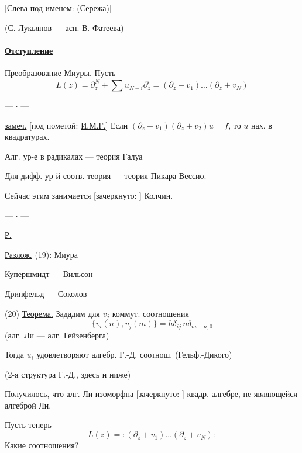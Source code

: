 [Слева под именем: (Сережа)]

(С. Лукьянов — асп. В. Фатеева)

\paragraph*{\underline{Отступление}}
\underline{Преобразование Миуры.} Пусть
\begin{equation*}
L(z)=\partial_z^N+\sum u_{N-i}\partial_z^i
=(\partial_z+v_1)\ldots(\partial_z+v_N) \tag{19}
\end{equation*}
\begin{center}— $\cdot$ —\end{center}
\underline{замеч.} [под пометой: \underline{И.М.Г.}]
Если $(\partial_z+v_1)(\partial_z+v_2)u=f$, то $u$ нах. в квадратурах.

Алг. ур-е в радикалах — теория Галуа

Для дифф. ур-й соотв. теория — теория Пикара-Вессио.

Сейчас этим занимается
[зачеркнуто: ]
Колчин.
\begin{center}— $\cdot$ —\end{center}
\underline{Р.}

\underline{Разлож.} (19): Миура

\hspace{3em}Купершмидт — Вильсон

\hspace{3em}Дринфельд — Соколов

(20) \underline{Теорема.} Зададим для $v_j$ коммут. соотношения
\begin{equation*}
\{v_i(n),v_j(m)\}=h\delta_{ij}\,n\delta_{m+n,0} \tag{21}
\end{equation*}
(алг. Ли — алг.
Гейзенберга)

Тогда $u_i$ удовлетворяют алгебр. Г.-Д.
соотнош. (Гельф.-Дикого)

(2-я структура Г.-Д., здесь и ниже)

Получилось, что алг. Ли изоморфна
[зачеркнуто: ]
квадр. алгебре, не являющейся алгеброй Ли.

Пусть теперь
\begin{equation*}
L(z)=:(\partial_z+v_1)\ldots(\partial_z+v_N): \tag{22}
\end{equation*}
Какие соотношения?

